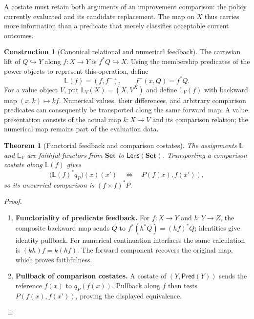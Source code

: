 \documentclass[11pt,a4paper]{article}
\numberwithin{equation}{section}
\newtheorem{theorem}{Theorem}[section]
\theoremstyle{definition}
\newtheorem{construction}[construction]{Construction}
\theoremstyle{remark}
\theoremstyle{plain}
\begin{document}
A costate must retain both arguments of an improvement comparison:
the policy currently evaluated and its candidate replacement. The map on
$X$ thus carries more information than a predicate that merely classifies
acceptable current outcomes.

\begin{construction}[Canonical relational and numerical feedback]
\label{con:cgt-canonical-coplay}
The cartesian lift of $Q\hookrightarrow Y$ along $f:X\to Y$ is
$f^*Q\hookrightarrow X$. Using the membership predicates of the power
objects to represent this operation, define
\[
 \mathbb L(f)=(f,f^-),\qquad f^-(x,Q)=f^*Q.
\]
For a value object $V$, put $\mathbb L_V(X)=(X,V^X)$ and define
$\mathbb L_V(f)$ with backward map $(x,k)\mapsto kf$.
Numerical values, their differences, and arbitrary comparison predicates
can consequently be transported along the same forward map. A value
presentation consists of the actual map $k:X\to V$ and its comparison
relation; the numerical map remains part of the evaluation data.
\end{construction}

\begin{theorem}[Functorial feedback and comparison costates]
\label{thm:cgt-coplay}
The assignments $\mathbb L$ and $\mathbb L_V$ are faithful functors
from $\mathbf{Set}$ to $\mathsf{Lens}(\mathbf{Set})$.
Transporting a comparison costate along $\mathbb L(f)$ gives
\begin{equation}\label{eq:cgt-costate-pullback}
 \bigl(\mathbb L(f)^*q_P\bigr)(x)(x')
 \quad\Longleftrightarrow\quad P(f(x),f(x')),
\end{equation}
so its uncurried comparison is $(f\times f)^*P$.
\end{theorem}
\begin{proof}
\leavevmode
\begin{enumerate}[label=\textup{(\arabic*)},leftmargin=*,itemsep=4pt,topsep=3pt]
  \item \textbf{Functoriality of predicate feedback.} For $f:X\to Y$ and $h:Y\to Z$, the composite backward map sends
$Q$ to $f^*(h^*Q)=(hf)^*Q$; identities give identity pullback. For numerical continuation interfaces the same calculation is
$(kh)f=k(hf)$. The forward component recovers the original map,
which proves faithfulness.
  \item \textbf{Pullback of comparison costates.} A costate of $(Y,\mathsf{Pred}(Y))$ sends
the reference $f(x)$ to $q_P(f(x))$. Pullback along $f$ then tests
$P(f(x),f(x'))$, proving the displayed equivalence.
\end{enumerate}
\end{proof}
\end{document}
